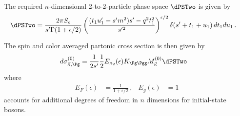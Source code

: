 The required $n$-dimensional 2-to-2-particle phase space $\dPSTwo$ is given by
\begin{align}
\dPSTwo &= \frac {2\pi S_\epsilon}{s'\Gamma(1+\epsilon/2)}\left(\frac{(t_1u_1'-s'm^2)s' - q^2t_1^2}{s'^2}\right)^{\epsilon/2}\delta(s'+t_1+u_1)\,dt_1du_1 \label{eq:dps2}\,.
\end{align}

The spin and color averaged partonic cross section is then given by
\begin{align}
d\sigma_{\vec \kappa,\Pg}^{(0)} &= \frac 1 {2s'}\frac 1 2 E_{\kappa_2}(\epsilon)K_{\Pg\Pgg} M_{\vec \kappa}^{(0)} \dPSTwo \label{eq:LOxs}
\end{align}
where
\begin{align}
E_{F}(\epsilon) &= \frac{1}{1+\epsilon/2}\,, & E_{g}(\epsilon) &= 1
\end{align}
accounts for additional degrees of freedom in $n$ dimensions for initial-state bosons.
